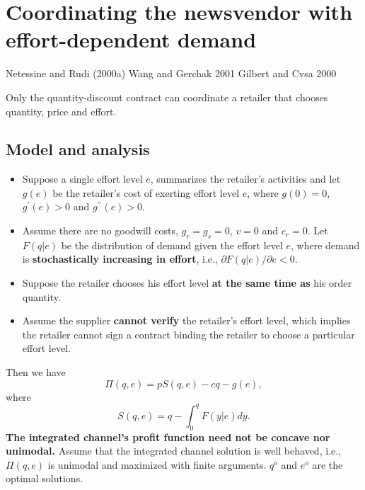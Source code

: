 \newpage
\section{Coordinating the newsvendor with effort-dependent demand}
\begin{note}
    Netessine and Rudi (2000a)
    Wang and Gerchak 2001
    Gilbert and Cvsa 2000
\end{note}
Only the quantity-discount contract can coordinate a retailer that chooses quantity, price and effort.

\subsection{Model and analysis}
\begin{itemize}
    \item Suppose a single effort level $e$, summarizes the retailer's activities and let $g(e)$ be the retailer's cost of exerting effort level $e$, where $g(0)=0$, $g^\prime(e)>0$ and $g^{\prime\prime}(e)>0$.
    \item  Assume there are no goodwill costs, $g_r=g_s=0$, $v=0$ and $c_r=0$. Let $F(q|e)$ be the distribution of demand given the effort level $e$, where demand is \textbf{stochastically increasing in effort}, i.e., $\partial F(q|e)/\partial e<0$.
    \item Suppose the retailer chooses his effort level \textbf{at the same time as} his order quantity. 
    \item Assume the supplier \textbf{cannot verify} the retailer's effort level, which implies the retailer cannot sign a contract binding the retailer to choose a particular effort level.
\end{itemize}

Then we have 
\begin{equation*}
    \Pi(q,e)=p S(q,e)-c q-g(e),
\end{equation*}
where 
\begin{equation*}
    S(q,e)=q-\int_0^q F(y|e)dy.
\end{equation*}
\textbf{The integrated channel’s profit function need not be concave nor unimodal.}
 Assume that the integrated channel solution is well behaved, i.e., $\Pi(q,e)$ is unimodal and maximized with finite arguments. $q^o$ and $e^o$ are the optimal solutions.


